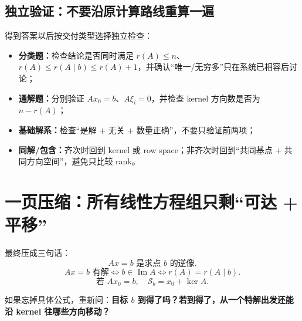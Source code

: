 \documentclass[11pt,a4paper]{ctexart}
\newcommand{\kw}[1]{\textbf{\color{deep}#1}}
\begin{document}
\subsection{独立验证：不要沿原计算路线重算一遍}

得到答案以后按交付类型选择独立检查：
\begin{itemize}
  \item \kw{分类题：}检查结论是否同时满足 $r(A)\le n$、$r(A)\le r(A\mid b)\le r(A)+1$，并确认“唯一/无穷多”只在系统已相容后讨论；
  \item \kw{通解题：}分别验证 $Ax_0=b$、$A\xi_i=0$，并检查 kernel 方向数是否为 $n-r(A)$；
  \item \kw{基础解系：}检查“是解 + 无关 + 数量正确”，不要只验证前两项；
  \item \kw{同解/包含：}齐次时回到 kernel 或 row space；非齐次时回到“共同基点 + 共同方向空间”，避免只比较 rank。
\end{itemize}

\section{一页压缩：所有线性方程组只剩“可达 + 平移”}

\begin{center}
\end{center}

最终压成三句话：
\[
\boxed{Ax=b\text{ 是求点 }b\text{ 的逆像}.}
\]
\[
\boxed{Ax=b\text{ 有解}\iff b\in\operatorname{Im}A\iff r(A)=r(A\mid b).}
\]
\[
\boxed{\text{若 }Ax_0=b,\quad\mathcal S_b=x_0+\ker A.}
\]

如果忘掉具体公式，重新问：\kw{目标 $b$ 到得了吗？若到得了，从一个特解出发还能沿 kernel 往哪些方向移动？}
\end{document}
